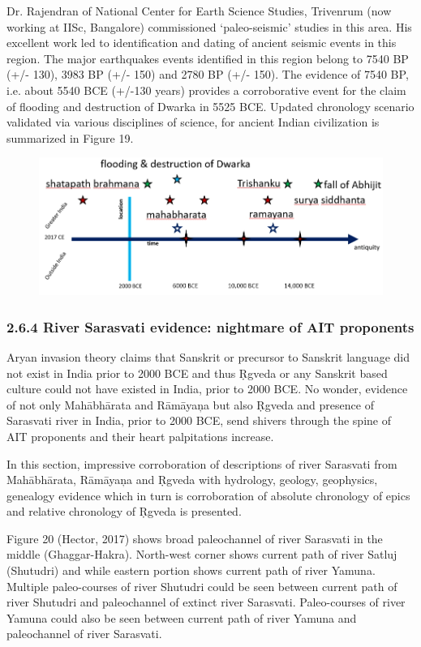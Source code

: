 Dr. Rajendran of National Center for Earth Science Studies, Trivenrum (now working at IISc, Bangalore) commissioned ‘paleo-seismic’ studies in this area. His excellent work led to identification and dating of ancient seismic events in this region. The major earthquakes events identified in this region belong to 7540 BP (+/- 130), 3983 BP (+/- 150) and 2780 BP (+/- 150). The evidence of 7540 BP, i.e. about 5540 BCE (+/-130 years) provides a corroborative event for the claim of flooding and destruction of Dwarka in 5525 BCE. Updated chronology scenario validated via various disciplines of science, for ancient Indian civilization is summarized in Figure 19.

\begin{figure}[!htbp]
\includegraphics[scale=0.28]{"images/8-19.jpg"}
\caption{}\label{art8-fig19}
\end{figure}


\subsubsection*{2.6.4 River Sarasvati evidence: nightmare of AIT proponents}

Aryan invasion theory claims that Sanskrit or precursor to Sanskrit language did not exist in India prior to 2000 BCE and thus Ṛgveda or any Sanskrit based culture could not have existed in India, prior to 2000 BCE. No wonder, evidence of not only Mahābhārata and Rāmāyaņa but also Ṛgveda and presence of Sarasvati river in India, prior to 2000 BCE, send shivers through the spine of AIT proponents and their heart palpitations increase.

In this section, impressive corroboration of descriptions of river Sarasvati from Mahābhārata, Rāmāyaņa and Ṛgveda with hydrology, geology, geophysics, genealogy evidence which in turn is corroboration of absolute chronology of epics and relative chronology of Ṛgveda is presented.

Figure 20 (Hector, 2017) shows broad paleochannel of river Sarasvati in the middle (Ghaggar-Hakra). North-west corner shows current path of river Satluj (Shutudri) and while eastern portion shows current path of river Yamuna. Multiple paleo-courses of river Shutudri could be seen between current path of river Shutudri and paleochannel of extinct river Sarasvati. Paleo-courses of river Yamuna could also be seen between current path of river Yamuna and paleochannel of river Sarasvati.

